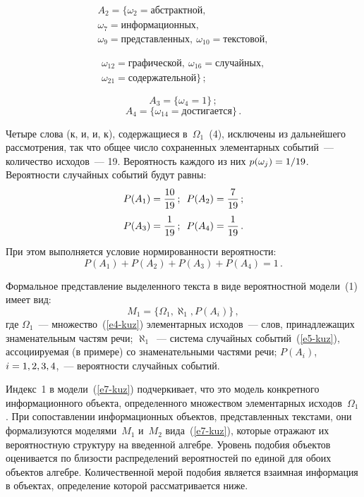 \begin{multicols}{2}
\vspace*{-12pt}

\noindent
\begin{multline*}
    A_2 = \{\omega_2 = \mbox{абстрактной},\\
     \omega_7= \mbox{информационных},\\
          \omega_9 = \mbox{представленных},\ \omega_{10} =
\mbox{текстовой},
     \end{multline*}

     \noindent
     \begin{multline*}
\omega_{12} = \mbox{графической},\ \omega_{16} = \mbox{случайных},\\
\omega_{21} = \mbox{содержательной}\}\,;
    \end{multline*}

    \noindent
    $$
    A_3=\{\omega_4= 1\}\,;
    $$
    $$
    A_4 =\{\omega_{14}= \mbox{достигается}\}\,.
    $$

  Четыре слова (к, и, и, к), содержащиеся в~$\Omega_1$~(4), исключены из
дальнейшего рассмотрения, так что общее число сохраненных элементарных
событий~--- количество исходов~--- 19. Вероятность каж\-до\-го из них
$p(\omega_j) \hm= 1/19$. Вероятности случайных событий будут равны:
  \begin{gather*}
  P(A_1) = \displaystyle\frac{\displaystyle 10\mathstrut}{\displaystyle 19\mathstrut}\,;\enskip  P(A_2) = \displaystyle\frac{\displaystyle 7\mathstrut}{\displaystyle 19\mathstrut}\,;\\
  P(A_3) = \displaystyle\frac{\displaystyle 1\mathstrut}{\displaystyle 19\mathstrut}\,;\enskip  P(A_4) = \displaystyle\frac{\displaystyle 1\mathstrut}{\displaystyle 19\mathstrut}\,.
  \end{gather*}
  При этом выполняется условие нормированности вероятности:
$$
P(A_1) + P(A_2) + P(A_3) + P(A_4) = 1\,.
$$

  Формальное представление выделенного текста в виде вероятностной
модели~(1) имеет вид:
  \begin{equation}
  M_1 =\{ \Omega_1, \aleph_1, P(A_i)\}\,,
  \label{e7-kuz}
  \end{equation}
где $\Omega_1$~--- множество~(\ref{e4-kuz}) элементарных исходов~--- слов,
принадлежащих знаменательным частям речи;
  $\aleph_1$~--- система случайных событий~(\ref{e5-kuz}), ассоциируемая (в
примере) со знаменательными частями речи;
  $P(A_i)$, $i \hm= 1, 2, 3, 4$,~--- вероятности случайных событий.

  Индекс~1 в модели~(\ref{e7-kuz}) подчеркивает, что это модель конкретного
информационного объекта, определенного множеством элементарных
исходов~$\Omega_1$. При сопоставлении информационных объектов,
представленных текстами, они формализуются моделями~$M_1$ и~$M_2$
вида~(\ref{e7-kuz}), которые отражают их вероятностную структуру на
введенной алгебре. Уровень подобия объектов оценивается по близости
распределений вероятностей по единой для обоих объектов алгебре.
Количественной мерой подобия является взаимная информация в объектах,
определение которой рассматривается ниже.


\end{multicols}
